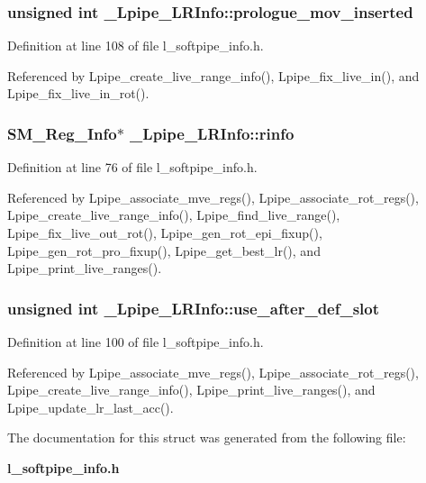 \subsubsection{\setlength{\rightskip}{0pt plus 5cm}unsigned int \bf{\_\-Lpipe\_\-LRInfo::prologue\_\-mov\_\-inserted}}\label{struct__Lpipe__LRInfo_eaffe45cfd023d8bf117f644ef7c58a3}




Definition at line 108 of file l\_\-softpipe\_\-info.h.

Referenced by Lpipe\_\-create\_\-live\_\-range\_\-info(), Lpipe\_\-fix\_\-live\_\-in(), and Lpipe\_\-fix\_\-live\_\-in\_\-rot().
\subsubsection{\setlength{\rightskip}{0pt plus 5cm}\bf{SM\_\-Reg\_\-Info}$\ast$ \bf{\_\-Lpipe\_\-LRInfo::rinfo}}\label{struct__Lpipe__LRInfo_c4314486f712f695d0c174ff10bc9428}




Definition at line 76 of file l\_\-softpipe\_\-info.h.

Referenced by Lpipe\_\-associate\_\-mve\_\-regs(), Lpipe\_\-associate\_\-rot\_\-regs(), Lpipe\_\-create\_\-live\_\-range\_\-info(), Lpipe\_\-find\_\-live\_\-range(), Lpipe\_\-fix\_\-live\_\-out\_\-rot(), Lpipe\_\-gen\_\-rot\_\-epi\_\-fixup(), Lpipe\_\-gen\_\-rot\_\-pro\_\-fixup(), Lpipe\_\-get\_\-best\_\-lr(), and Lpipe\_\-print\_\-live\_\-ranges().
\subsubsection{\setlength{\rightskip}{0pt plus 5cm}unsigned int \bf{\_\-Lpipe\_\-LRInfo::use\_\-after\_\-def\_\-slot}}\label{struct__Lpipe__LRInfo_ae8e3bca328790f251be3123eabfe202}




Definition at line 100 of file l\_\-softpipe\_\-info.h.

Referenced by Lpipe\_\-associate\_\-mve\_\-regs(), Lpipe\_\-associate\_\-rot\_\-regs(), Lpipe\_\-create\_\-live\_\-range\_\-info(), Lpipe\_\-print\_\-live\_\-ranges(), and Lpipe\_\-update\_\-lr\_\-last\_\-acc().

The documentation for this struct was generated from the following file:\begin{CompactItemize}
\item 
\bf{l\_\-softpipe\_\-info.h}\end{CompactItemize}
